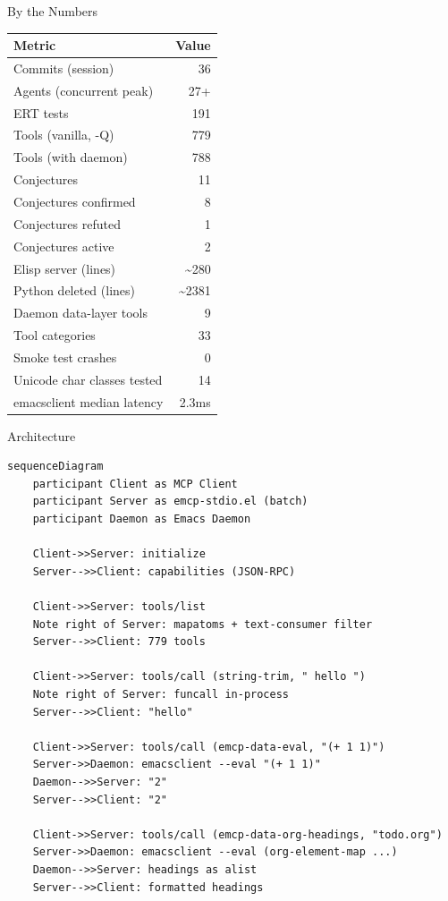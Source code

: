 \documentclass[presentation]{beamer}
\begin{document}
\begin{frame}[label={sec:org36a0586}]{By the Numbers}
\begin{center}
\begin{tabular}{lr}
Metric & Value\\
\hline
Commits (session) & 36\\
Agents (concurrent peak) & 27+\\
ERT tests & 191\\
Tools (vanilla, -Q) & 779\\
Tools (with daemon) & 788\\
Conjectures & 11\\
Conjectures confirmed & 8\\
Conjectures refuted & 1\\
Conjectures active & 2\\
Elisp server (lines) & \textasciitilde{}280\\
Python deleted (lines) & \textasciitilde{}2381\\
Daemon data-layer tools & 9\\
Tool categories & 33\\
Smoke test crashes & 0\\
Unicode char classes tested & 14\\
emacsclient median latency & 2.3ms\\
\end{tabular}
\end{center}
\end{frame}
\begin{frame}[label={sec:orge44f5b2},fragile]{Architecture}
 \begin{verbatim}
sequenceDiagram
    participant Client as MCP Client
    participant Server as emcp-stdio.el (batch)
    participant Daemon as Emacs Daemon

    Client->>Server: initialize
    Server-->>Client: capabilities (JSON-RPC)

    Client->>Server: tools/list
    Note right of Server: mapatoms + text-consumer filter
    Server-->>Client: 779 tools

    Client->>Server: tools/call (string-trim, " hello ")
    Note right of Server: funcall in-process
    Server-->>Client: "hello"

    Client->>Server: tools/call (emcp-data-eval, "(+ 1 1)")
    Server->>Daemon: emacsclient --eval "(+ 1 1)"
    Daemon-->>Server: "2"
    Server-->>Client: "2"

    Client->>Server: tools/call (emcp-data-org-headings, "todo.org")
    Server->>Daemon: emacsclient --eval (org-element-map ...)
    Daemon-->>Server: headings as alist
    Server-->>Client: formatted headings
\end{verbatim}
\end{frame}
\end{document}

